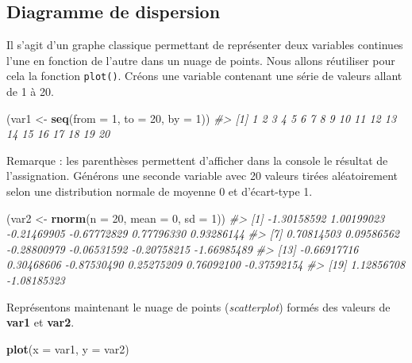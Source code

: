 \documentclass[]{article}
\newenvironment{Shaded}{\begin{snugshade}}{\end{snugshade}}
\newcommand{\CommentTok}[1]{\textcolor[rgb]{0.56,0.35,0.01}{\textit{#1}}}
\newcommand{\DataTypeTok}[1]{\textcolor[rgb]{0.13,0.29,0.53}{#1}}
\newcommand{\DecValTok}[1]{\textcolor[rgb]{0.00,0.00,0.81}{#1}}
\newcommand{\KeywordTok}[1]{\textcolor[rgb]{0.13,0.29,0.53}{\textbf{#1}}}
\newcommand{\NormalTok}[1]{#1}
\newcommand{\StringTok}[1]{\textcolor[rgb]{0.31,0.60,0.02}{#1}}
\begin{document}
\hypertarget{diagramme-de-dispersion}{%
\subsection{Diagramme de dispersion}\label{diagramme-de-dispersion}}

Il s'agit d'un graphe classique permettant de représenter deux variables continues l'une en fonction de l'autre dans un nuage de points. Nous allons réutiliser pour cela la fonction \texttt{plot()}.
Créons une variable contenant une série de valeurs allant de 1 à 20.

\begin{Shaded}
\begin{Highlighting}[]
\NormalTok{(var1 <-}\StringTok{ }\KeywordTok{seq}\NormalTok{(}\DataTypeTok{from =} \DecValTok{1}\NormalTok{, }\DataTypeTok{to =} \DecValTok{20}\NormalTok{, }\DataTypeTok{by =} \DecValTok{1}\NormalTok{))}
\CommentTok{#>  [1]  1  2  3  4  5  6  7  8  9 10 11 12 13 14 15 16 17 18 19 20}
\end{Highlighting}
\end{Shaded}

Remarque : les parenthèses permettent d'afficher dans la console le résultat de l'assignation. Générons une seconde variable avec 20 valeurs tirées aléatoirement selon une distribution normale de moyenne 0 et d'écart-type 1.

\begin{Shaded}
\begin{Highlighting}[]
\NormalTok{(var2 <-}\StringTok{ }\KeywordTok{rnorm}\NormalTok{(}\DataTypeTok{n =} \DecValTok{20}\NormalTok{, }\DataTypeTok{mean =} \DecValTok{0}\NormalTok{, }\DataTypeTok{sd =} \DecValTok{1}\NormalTok{))}
\CommentTok{#>  [1] -1.30158592  1.00199023 -0.21469905 -0.67772829  0.77796330  0.93286144}
\CommentTok{#>  [7]  0.70814503  0.09586562 -0.28800979 -0.06531592 -0.20758215 -1.66985489}
\CommentTok{#> [13] -0.66917716  0.30468606 -0.87530490  0.25275209  0.76092100 -0.37592154}
\CommentTok{#> [19]  1.12856708 -1.08185323}
\end{Highlighting}
\end{Shaded}

Représentons maintenant le nuage de points (\emph{scatterplot}) formés des valeurs de \textbf{var1} et \textbf{var2}.

\begin{Shaded}
\begin{Highlighting}[]
\KeywordTok{plot}\NormalTok{(}\DataTypeTok{x =}\NormalTok{ var1, }\DataTypeTok{y =}\NormalTok{ var2)}
\end{Highlighting}
\end{Shaded}
\end{document}
